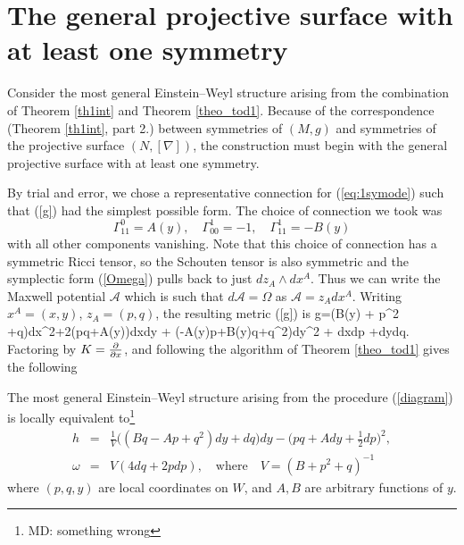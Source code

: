 \section{The general projective surface with at least one symmetry}
\label{general}




Consider the most general Einstein--Weyl structure arising from the combination
of Theorem \ref{th1int} and Theorem \ref{theo_tod1}. Because of the correspondence 
(Theorem \ref{th1int}, part 2.)
between symmetries of $(M, g)$ and symmetries of the projective surface $(N, [\nabla])$, the construction must begin with the general projective surface with at least one symmetry. 
 
By trial and error, we chose a representative connection for (\ref{eq:1symode}) such that (\ref{g}) had the simplest possible form. The choice of connection we took was
\[
\Gamma^{0}_{11}=A(y),\quad \Gamma^{1}_{00}=-1, \quad \Gamma^{1}_{11}=-B(y)
\]
with all other components vanishing. Note that this choice of connection has a symmetric Ricci tensor, so the Schouten tensor is also symmetric and the symplectic form (\ref{Omega}) pulls back to just $dz_A\wedge dx^A$. Thus we can write the Maxwell potential $\mathcal{A}$ which is such that $d\mathcal{A}=\Omega$ as $\mathcal{A}=z_Adx^A$. Writing $x^A=(x,y)$, $z_A=(p,q)$, the resulting metric (\ref{g}) is
\be
\label{einstein_1}
g=(B(y) + p^2 +q)dx^2+2(pq+A(y))dxdy + (-A(y)p+B(y)q+q^2)dy^2 + dxdp +dydq.
\ee
Factoring by $K=\frac{\partial}{\partial x}$, and following the algorithm of Theorem
\ref{theo_tod1} gives the following
\begin{prop}
\label{prop1}
The most general  Einstein--Weyl structure arising
from the procedure (\ref{diagram}) is locally equivalent to\footnote{MD: something wrong}
\begin{eqnarray}
\label{ew_final}
h&=&\frac{1}{V}\big((Bq -Ap+ q^2)dy+dq\big)dy
-\Big({pq+A}dy+\frac{1}{2}dp\Big)^2, \label{genh} \\
\omega&=&V(4dq+2 pdp), \quad\mbox{where}\quad V=
({B}+ p^2+q)^{-1}\nonumber
\end{eqnarray}
where $(p, q, y)$ are local coordinates on $W$, and $A, B$ are arbitrary functions of $y$.
\end{prop}
